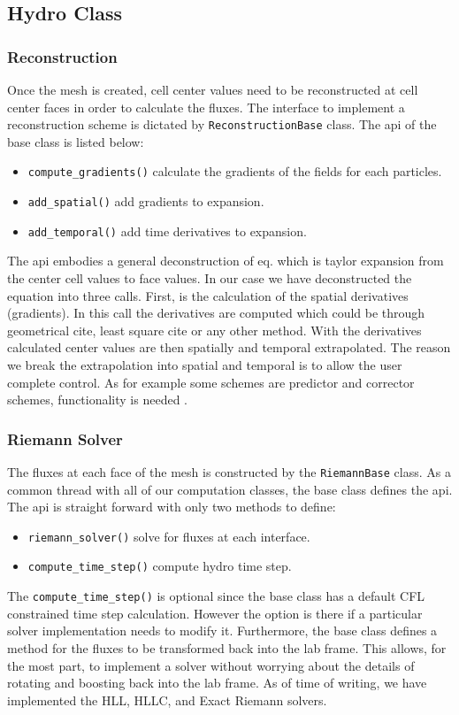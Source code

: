 \subsection{Hydro Class}
\subsubsection{Reconstruction}
Once the mesh is created, cell center values need to be reconstructed at cell center faces
in order to calculate the fluxes. The interface to implement a reconstruction
scheme is dictated by \lstinline{ReconstructionBase} class. The api of the base class is
listed below:
\begin{itemize}
	\item \lstinline{compute_gradients()} calculate the gradients of the fields for each particles.
    \item \lstinline{add_spatial()} add gradients to expansion.
    \item \lstinline{add_temporal()} add time derivatives to expansion.
\end{itemize}
The api embodies a general deconstruction of eq. which is taylor expansion from the
center cell values to face values. In our case we have deconstructed the equation into
three calls. First, is the calculation of the spatial derivatives (gradients). In this
call the derivatives are computed which could be through geometrical cite, least square cite or any other
method. With the derivatives calculated center values are then spatially and temporal
extrapolated. The reason we break the extrapolation into spatial and temporal is to
allow the user complete control. As for example some schemes are predictor and corrector
schemes, functionality is needed .

\subsubsection{Riemann Solver}
The fluxes at each face of the mesh is constructed by the \lstinline{RiemannBase} class.
As a common thread with all of our computation classes, the base class defines the api.
The api is straight forward with only two methods to define:
\begin{itemize}
	\item \lstinline{riemann_solver()} solve for fluxes at each interface.
    \item \lstinline{compute_time_step()} compute hydro time step.
\end{itemize}
The \lstinline{compute_time_step()} is optional since the base class has a default
CFL constrained time step calculation. However the option is there if a particular 
solver implementation needs to modify it. Furthermore, the base class defines a 
method for the fluxes to be transformed back into the lab frame. This allows,
for the most part, to implement a solver without worrying about the details of
rotating and boosting back into the lab frame. As of time of writing, we have
implemented the HLL, HLLC, and Exact Riemann solvers.

